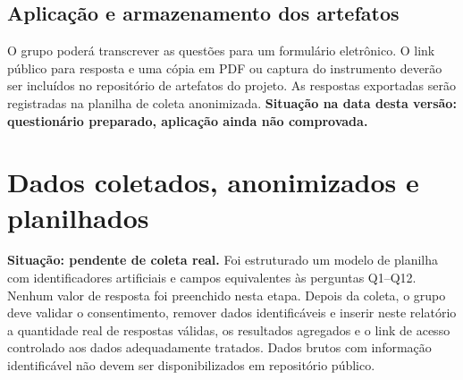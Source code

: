 \documentclass[12pt,a4paper,oneside]{report}
\begin{document}
\subsection{Aplicação e armazenamento dos artefatos}
O grupo poderá transcrever as questões para um formulário eletrônico. O link público para resposta e uma cópia em PDF ou captura do instrumento deverão ser incluídos no repositório de artefatos do projeto. As respostas exportadas serão registradas na planilha de coleta anonimizada. \textbf{Situação na data desta versão: questionário preparado, aplicação ainda não comprovada.}

\section{Dados coletados, anonimizados e planilhados}
\textbf{Situação: pendente de coleta real.} Foi estruturado um modelo de planilha com identificadores artificiais e campos equivalentes às perguntas Q1--Q12. Nenhum valor de resposta foi preenchido nesta etapa. Depois da coleta, o grupo deve validar o consentimento, remover dados identificáveis e inserir neste relatório a quantidade real de respostas válidas, os resultados agregados e o link de acesso controlado aos dados adequadamente tratados. Dados brutos com informação identificável não devem ser disponibilizados em repositório público.
\end{document}
